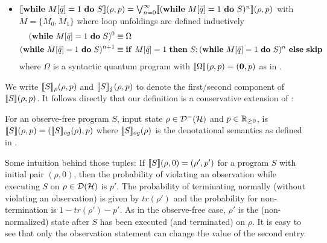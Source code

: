 \documentclass[a4paper,UKenglish,cleveref, autoref, thm-restate]{lipics-v2021}
\begin{document}
\begin{definition}
\begin{itemize}
    \item $\llbracket \mathbf{while } \text{ }M[\Bar{q}]=1 \text{ }\mathbf{ do } \text{ }S \rrbracket (\rho,p) = \bigvee_{n=0}^\infty \llbracket (\mathbf{while } \text{ }M[\Bar{q}]=1 \text{ }\mathbf{ do } \text{ }S)^n \rrbracket (\rho,p)$
    with $M=\{M_0, M_1\}$ where loop unfoldings are defined inductively
    \begin{align*}
        (\mathbf{while } \text{ }M[\Bar{q}]=1 \text{ }\mathbf{ do } \text{ }S)^0 &\equiv \Omega\\
        (\mathbf{while } \text{ }M[\Bar{q}]=1 \text{ }\mathbf{ do } \text{ }S)^{n+1} &\equiv \mathbf{if} \text{ }M[\Bar{q}]=1 \text{ } \mathbf{then} \text{ } S; (\mathbf{while } \text{ }M[\Bar{q}]=1 \text{ }\mathbf{ do } \text{ }S)^n \text{ } \mathbf{else} \text{ } \mathbf{skip}
    \end{align*}
    where $\Omega$ is a syntactic quantum program with $\llbracket \Omega \rrbracket(\rho,p) = (\mathbf{0},p)$ as in \cite{floydHoareLogic}.
\end{itemize}
\end{definition}
We write $\llbracket S \rrbracket_{\rho} (\rho,p)$ and $\llbracket S \rrbracket_{\lightning} (\rho,p)$ to denote the first/second component of $\llbracket S \rrbracket (\rho,p)$.
It follows directly that our definition is a conservative extension of \cite{floydHoareLogic}:
\begin{proposition}
    \label{prop:unconditionedSemantics}
    For an observe-free program $S$, input state $\rho \in \mathcal{D}^- (\mathcal{H})$ and $p\in \mathbb{R}_{\geq 0}$, is $\llbracket S \rrbracket (\rho,p) = (\llbracket S \rrbracket_{og} (\rho),p)$
    where $\llbracket S \rrbracket_{og} (\rho)$ is the denotational semantics as defined in \cite{floydHoareLogic}.
\end{proposition}

Some intuition behind those tuples: If $\llbracket S \rrbracket(\rho,0) = (\rho',p')$ for a program $S$ with initial pair $(\rho,0)$, then the probability of violating an observation while executing $S$ on $\rho \in \mathcal{D}(\mathcal{H})$ is $p'$. The probability of terminating normally (without violating an observation) is given by $tr(\rho')$ and the probability for non-termination is $1-tr(\rho')-p'$. As in the observe-free case, $\rho'$ is the (non-normalized) state after $S$ has been executed (and terminated) on $\rho$. It is easy to see that only the observation statement can change the value of the second entry.
\end{document}
